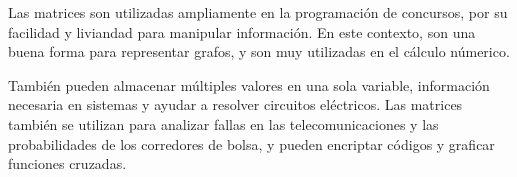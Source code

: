 Las matrices son utilizadas ampliamente en la programación de concursos, por su facilidad y liviandad para manipular información. En este contexto, son una buena forma para representar grafos, y son muy utilizadas en el cálculo númerico. 

También pueden almacenar múltiples valores en una sola variable, información necesaria en sistemas y ayudar a resolver circuitos eléctricos. Las matrices también se utilizan para analizar fallas en las telecomunicaciones y las probabilidades de los corredores de bolsa, y pueden encriptar códigos y graficar funciones cruzadas.